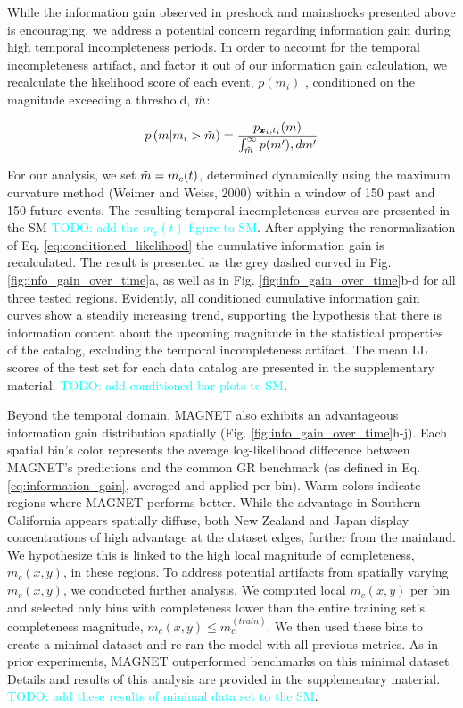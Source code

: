 \documentclass[pdflatex]{sn-jnl}
\newcommand{\neri}[1]{{\textcolor{cyan}{#1}}}
\begin{document}
While the information gain observed in preshock and mainshocks presented above is encouraging, we address a potential concern regarding information gain during high temporal incompleteness periods\cite{stockman_forecasting_2023}. In order to account for the temporal incompleteness artifact, and factor it out of our information gain calculation, we recalculate the likelihood score of each event, $p(m_i)$ , conditioned on the magnitude exceeding a threshold, $\Tilde{m}$:

\begin{equation}
    p \left( m \vert m_i > \Tilde{m} \right) = \frac{p_{\pmb{x}_i, t_i}(m)} {\int_{\Tilde{m}}^{\infty} p(m') ,dm'}
    \label{eq:conditioned_likelihood}
\end{equation}

For our analysis, we set $\Tilde{m} = m_c(t)$, determined dynamically using the maximum curvature method (Weimer and Weiss, 2000) within a window of 150 past and 150 future events. The resulting temporal incompleteness curves are presented in the SM \neri{TODO: add the $m_c(t)$ figure to SM}. After applying the renormalization of Eq. \ref{eq:conditioned_likelihood} the cumulative information gain is recalculated. The result is presented as the grey dashed curved in Fig.  \ref{fig:info_gain_over_time}a, as well as in Fig. \ref{fig:info_gain_over_time}b-d for all three tested regions. Evidently, all conditioned cumulative information gain curves show a steadily increasing trend, supporting the hypothesis that there is information content about the upcoming magnitude in the statistical properties of the catalog, excluding the temporal incompleteness artifact. The mean LL scores of the test set for each data catalog are presented in the supplementary material. \neri{TODO: add conditioned bar plots to SM}.

Beyond the temporal domain, MAGNET also exhibits an advantageous information gain distribution spatially (Fig. \ref{fig:info_gain_over_time}h-j). Each spatial bin's color represents the average log-likelihood difference between MAGNET's predictions and the common GR benchmark (as defined in Eq. \ref{eq:information_gain}, averaged and applied per bin). Warm colors indicate regions where MAGNET performs better. While the advantage in Southern California appears spatially diffuse, both New Zealand and Japan display concentrations of high advantage at the dataset edges, further from the mainland. We hypothesize this is linked to the high local magnitude of completeness, $m_c(x,y)$, in these regions. To address potential artifacts from spatially varying $m_c(x,y)$, we conducted further analysis. We computed local $m_c(x,y)$ per bin and selected only bins with completeness lower than the entire training set's completeness magnitude, $m_c \left( x,y \right)  \leq m_c^{ \left( train \right) }$. We then used these bins to create a minimal dataset and re-ran the model with all previous metrics. As in prior experiments, MAGNET outperformed benchmarks on this minimal dataset. Details and results of this analysis are provided in the supplementary material. \neri{TODO: add these results of minimal data set to the SM}.
\end{document}
